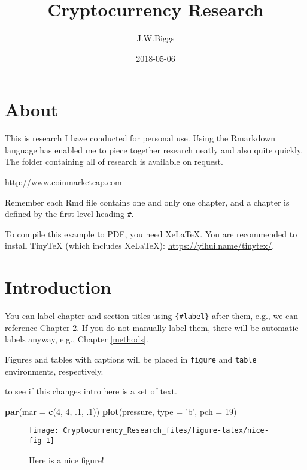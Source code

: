 \documentclass[]{book}
\title{Cryptocurrency Research}
\author{J.W.Biggs}
\date{2018-05-06}
\newenvironment{Shaded}{\begin{snugshade}}{\end{snugshade}}
\newcommand{\KeywordTok}[1]{\textcolor[rgb]{0.13,0.29,0.53}{\textbf{{#1}}}}
\newcommand{\DataTypeTok}[1]{\textcolor[rgb]{0.13,0.29,0.53}{{#1}}}
\newcommand{\DecValTok}[1]{\textcolor[rgb]{0.00,0.00,0.81}{{#1}}}
\newcommand{\StringTok}[1]{\textcolor[rgb]{0.31,0.60,0.02}{{#1}}}
\newcommand{\NormalTok}[1]{{#1}}
\theoremstyle{definition}
\theoremstyle{definition}
\theoremstyle{definition}
\theoremstyle{remark}
\begin{document}
\maketitle

{
\setcounter{tocdepth}{1}
\tableofcontents
}
\chapter{About}\label{about}

This is research I have conducted for personal use. Using the Rmarkdown
language has enabled me to piece together research neatly and also quite
quickly. The folder containing all of research is available on request.

\url{http://www.coinmarketcap.com}

Remember each Rmd file contains one and only one chapter, and a chapter
is defined by the first-level heading \texttt{\#}.

To compile this example to PDF, you need XeLaTeX. You are recommended to
install TinyTeX (which includes XeLaTeX):
\url{https://yihui.name/tinytex/}.

\chapter{Introduction}\label{intro}

You can label chapter and section titles using \texttt{\{\#label\}}
after them, e.g., we can reference Chapter \ref{intro}. If you do not
manually label them, there will be automatic labels anyway, e.g.,
Chapter \ref{methods}.

Figures and tables with captions will be placed in \texttt{figure} and
\texttt{table} environments, respectively.

to see if this changes intro here is a set of text.

\begin{Shaded}
\begin{Highlighting}[]
\KeywordTok{par}\NormalTok{(}\DataTypeTok{mar =} \KeywordTok{c}\NormalTok{(}\DecValTok{4}\NormalTok{, }\DecValTok{4}\NormalTok{, .}\DecValTok{1}\NormalTok{, .}\DecValTok{1}\NormalTok{))}
\KeywordTok{plot}\NormalTok{(pressure, }\DataTypeTok{type =} \StringTok{'b'}\NormalTok{, }\DataTypeTok{pch =} \DecValTok{19}\NormalTok{)}
\end{Highlighting}
\end{Shaded}

\begin{figure}

{\centering \texttt{[image: Cryptocurrency\_Research\_files/figure-latex/nice-fig-1]} 

}

\caption{Here is a nice figure!}\label{fig:nice-fig}
\end{figure}
\end{document}

